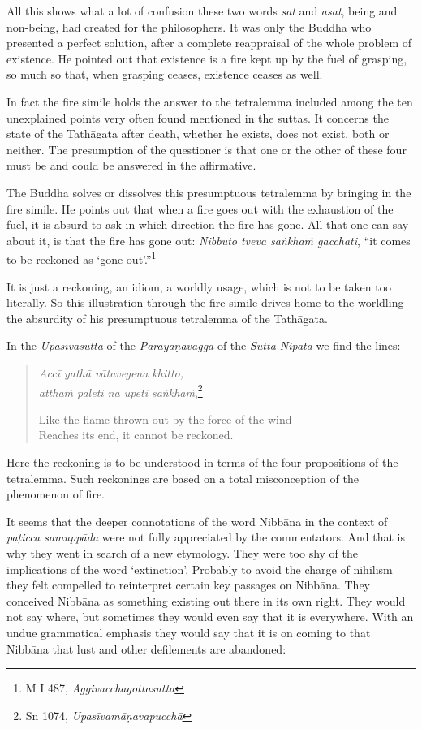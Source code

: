 All this shows what a lot of confusion these two words \emph{sat} and \emph{asat}, being and non-being, had created for the philosophers. It was only the Buddha who presented a perfect solution, after a complete reappraisal of the whole problem of existence. He pointed out that existence is a fire kept up by the fuel of grasping, so much so that, when grasping ceases, existence ceases as well.

In fact the fire simile holds the answer to the tetralemma included among the ten unexplained points very often found mentioned in the suttas. It concerns the state of the Tathāgata after death, whether he exists, does not exist, both or neither. The presumption of the questioner is that one or the other of these four must be and could be answered in the affirmative.

The Buddha solves or dissolves this presumptuous tetralemma by bringing in the fire simile. He points out that when a fire goes out with the exhaustion of the fuel, it is absurd to ask in which direction the fire has gone. All that one can say about it, is that the fire has gone out: \emph{Nibbuto tveva saṅkhaṁ gacchati}, ``it comes to be reckoned as `gone out'.''\footnote{M I 487, \emph{Aggivacchagottasutta}}

It is just a reckoning, an idiom, a worldly usage, which is not to be taken too literally. So this illustration through the fire simile drives home to the worldling the absurdity of his presumptuous tetralemma of the Tathāgata.

In the \emph{Upasīvasutta} of the \emph{Pārāyaṇavagga} of the \emph{Sutta Nipāta} we find the lines:

\begin{quote}
\emph{Accī yathā vātavegena khitto,}\\
\emph{atthaṁ paleti na upeti saṅkhaṁ},\footnote{Sn 1074, \emph{Upasīvamāṇavapucchā}}

Like the flame thrown out by the force of the wind\\
Reaches its end, it cannot be reckoned.
\end{quote}

Here the reckoning is to be understood in terms of the four propositions of the tetralemma. Such reckonings are based on a total misconception of the phenomenon of fire.

It seems that the deeper connotations of the word Nibbāna in the context of \emph{paṭicca samuppāda} were not fully appreciated by the commentators. And that is why they went in search of a new etymology. They were too shy of the implications of the word `extinction'. Probably to avoid the charge of nihilism they felt compelled to reinterpret certain key passages on Nibbāna. They conceived Nibbāna as something existing out there in its own right. They would not say where, but sometimes they would even say that it is everywhere. With an undue grammatical emphasis they would say that it is on coming to that Nibbāna that lust and other defilements are abandoned:

